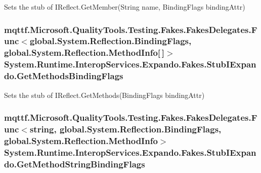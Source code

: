Sets the stub of I\-Reflect.\-Get\-Member(\-String name, Binding\-Flags binding\-Attr)

\hypertarget{class_system_1_1_runtime_1_1_interop_services_1_1_expando_1_1_fakes_1_1_stub_i_expando_abc0c9c10134b33bae0a9350f3be089ea}{
\subsubsection[{Get\-Methods\-Binding\-Flags}]{\setlength{\rightskip}{0pt plus 5cm}mqttf.\-Microsoft.\-Quality\-Tools.\-Testing.\-Fakes.\-Fakes\-Delegates.\-Func$<$global.\-System.\-Reflection.\-Binding\-Flags, global.\-System.\-Reflection.\-Method\-Info\mbox{[}$\,$\mbox{]}$>$ System.\-Runtime.\-Interop\-Services.\-Expando.\-Fakes.\-Stub\-I\-Expando.\-Get\-Methods\-Binding\-Flags}}\label{class_system_1_1_runtime_1_1_interop_services_1_1_expando_1_1_fakes_1_1_stub_i_expando_abc0c9c10134b33bae0a9350f3be089ea}


Sets the stub of I\-Reflect.\-Get\-Methods(\-Binding\-Flags binding\-Attr)

\hypertarget{class_system_1_1_runtime_1_1_interop_services_1_1_expando_1_1_fakes_1_1_stub_i_expando_aaf6ff2a02872b0b4cfc3da838551a942}{
\subsubsection[{Get\-Method\-String\-Binding\-Flags}]{\setlength{\rightskip}{0pt plus 5cm}mqttf.\-Microsoft.\-Quality\-Tools.\-Testing.\-Fakes.\-Fakes\-Delegates.\-Func$<$string, global.\-System.\-Reflection.\-Binding\-Flags, global.\-System.\-Reflection.\-Method\-Info$>$ System.\-Runtime.\-Interop\-Services.\-Expando.\-Fakes.\-Stub\-I\-Expando.\-Get\-Method\-String\-Binding\-Flags}}\label{class_system_1_1_runtime_1_1_interop_services_1_1_expando_1_1_fakes_1_1_stub_i_expando_aaf6ff2a02872b0b4cfc3da838551a942}


